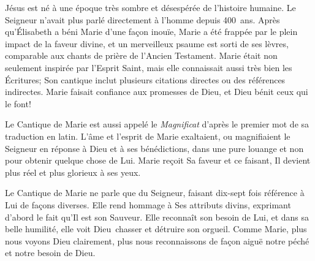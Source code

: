 


Jésus est né à une époque très sombre et désespérée de l'histoire humaine. Le Seigneur n'avait plus parlé directement à l'homme depuis 400~ans. Après qu'Élisabeth a béni Marie d'une façon inouïe, Marie a été frappée par le plein impact de la faveur divine, et un merveilleux psaume est sorti de ses lèvres, comparable aux chants de prière de l'Ancien Testament. Marie était non seulement inspirée par l'Esprit Saint, mais elle connaissait aussi très bien les Écritures; Son cantique inclut plusieurs citations directes ou des références indirectes. Marie faisait confiance aux promesses de Dieu, et Dieu bénit ceux qui le font!

Le Cantique de Marie est aussi appelé le \emph{Magnificat} d'après le premier mot de sa traduction en latin. L'âme et l'esprit de Marie exaltaient, ou \og magnifiaient \fg{} le Seigneur en réponse à Dieu et à ses bénédictions, dans une pure louange et non pour obtenir quelque chose de Lui. Marie reçoit Sa faveur et ce faisant, Il devient plus réel et plus glorieux à ses yeux.

Le Cantique de Marie ne parle que du Seigneur, faisant dix-sept fois référence à Lui de façons diverses. Elle rend hommage à Ses attributs divins, exprimant d'abord le fait qu'Il est son Sauveur. Elle reconnaît son besoin de Lui, et dans sa belle humilité, elle voit Dieu~chasser et détruire son orgueil. Comme Marie, plus nous voyons Dieu clairement, plus nous reconnaissons de façon aiguë notre péché et notre besoin de Dieu.

